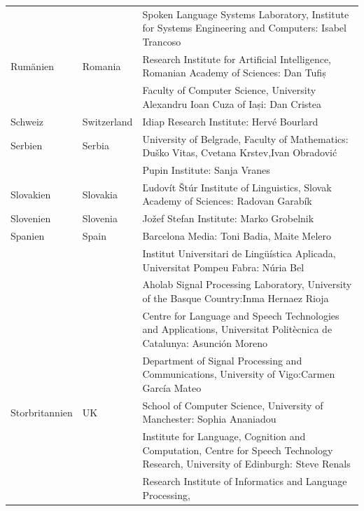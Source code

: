 \begin{longtable}{llp{114mm}}
  & & Spoken Language Systems Laboratory, Institute for Systems Engineering and Computers: Isabel Trancoso \\ \addlinespace
  Rumänien & \textcolor{grey1}{Romania} & Research Institute for Artificial Intelligence, Romanian Academy of Sciences: Dan Tufiș \\ \addlinespace
  & & Faculty of Computer Science, University Alexandru Ioan Cuza of
  Iași: Dan Cristea \\ \addlinespace
  Schweiz & \textcolor{grey1}{Switzerland} & Idiap Research Institute: Hervé Bourlard \\ \addlinespace 
  Serbien & \textcolor{grey1}{Serbia} & University of Belgrade, Faculty of Mathematics: Duško Vitas, Cvetana Krstev,\newline Ivan Obradović \\ \addlinespace
  & & Pupin Institute: Sanja Vranes \\ \addlinespace  
  Slovakien & \textcolor{grey1}{Slovakia} & Ľudovít Štúr Institute of Linguistics, Slovak Academy of Sciences: Radovan Garabík \\ \addlinespace 
  Slovenien & \textcolor{grey1}{Slovenia} & Jožef Stefan Institute: Marko Grobelnik \\ \addlinespace 
  Spanien & \textcolor{grey1}{Spain} & Barcelona Media: Toni Badia, Maite Melero \\ \addlinespace 
  & & Institut Universitari de Lingüística Aplicada, Universitat Pompeu Fabra: Núria Bel \\ \addlinespace 
  & & Aholab Signal Processing Laboratory, University of the Basque Country:\newline Inma Hernaez Rioja \\ \addlinespace 
  & & Centre for Language and Speech Technologies and Applications, Universitat Politècnica de Catalunya:  Asunción Moreno \\ \addlinespace 
  & & Department of Signal Processing and Communications, University
  of Vigo:\newline Carmen García Mateo \\ \addlinespace 
  Storbritannien & \textcolor{grey1}{UK} & 
  School of Computer Science, University of Manchester: Sophia Ananiadou \\ \addlinespace 
  & & Institute for Language, Cognition and Computation, Centre for Speech Technology Research, University of Edinburgh: Steve Renals \\ \addlinespace 
  & & Research Institute of Informatics and Language Processing,

\end{longtable}

